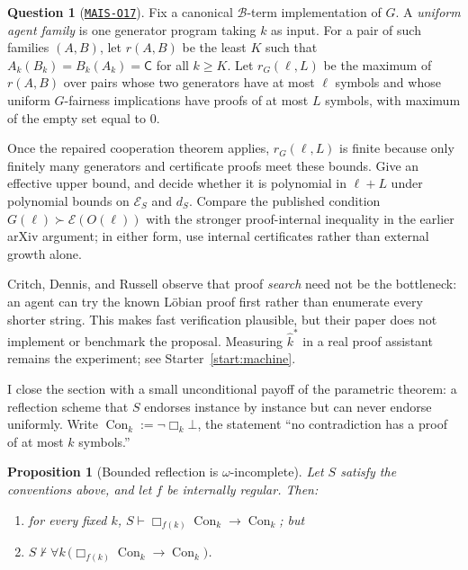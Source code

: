 \documentclass[11pt]{amsart}
\newcommand{\Oid}[1]{\href{https://github.com/lionellevine/MAIS/blob/main/open-problems/MAIS-O#1.md}{\texttt{MAIS-O#1}}}
\theoremstyle{plain}
\newtheorem{proposition}[theorem]{Proposition}
\theoremstyle{definition}
\newtheorem{question}[theorem]{Question}
\newcommand{\Con}{\operatorname{Con}}
\newcommand{\Bud}{\mathcal{B}}
\begin{document}
\begin{question}[\Oid{17}]
\label{q:polyfairbot}
Fix a canonical $\Bud$-term implementation of $G$. A \emph{uniform agent family} is one generator program taking $k$ as input. For a pair of such families $(A,B)$, let $r(A,B)$ be the least $K$ such that $A_k(B_k)=B_k(A_k)=\mathsf C$ for all $k\ge K$. Let $r_G(\ell,L)$ be the maximum of $r(A,B)$ over pairs whose two generators have at most $\ell$ symbols and whose uniform $G$-fairness implications have proofs of at most $L$ symbols, with maximum of the empty set equal to $0$.

Once the repaired cooperation theorem applies, $r_G(\ell,L)$ is finite because only finitely many generators and certificate proofs meet these bounds. Give an effective upper bound, and decide whether it is polynomial in $\ell+L$ under polynomial bounds on $\mathcal E_S$ and $d_S$. Compare the published condition $G(\ell)\succ\mathcal E(O(\ell))$ with the stronger proof-internal inequality in the earlier arXiv argument; in either form, use internal certificates rather than external growth alone.
\end{question}

Critch, Dennis, and Russell \cite{cdr2022} observe that proof \emph{search} need not be the bottleneck: an agent can try the known L\"obian proof first rather than enumerate every shorter string. This makes fast verification plausible, but their paper does not implement or benchmark the proposal. Measuring $\hat{k}^{*}$ in a real proof assistant remains the experiment; see Starter~\ref{start:machine}.

I close the section with a small unconditional payoff of the parametric theorem: a reflection scheme that $S$ endorses instance by instance but can never endorse uniformly. Write $\Con_k := \neg\Box_k \bot$, the statement ``no contradiction has a proof of at most $k$ symbols.''

\begin{proposition}[Bounded reflection is $\omega$-incomplete]
\label{prop:omega}
Let $S$ satisfy the conventions above, and let $f$ be internally regular. Then:
\begin{enumerate}
\item for every fixed $k$, \; $S \vdash \Box_{f(k)}\Con_k \to \Con_k$; \quad but
\item $S \nvdash \forall k\,\bigl(\Box_{f(k)}\Con_k \to \Con_k\bigr)$.
\end{enumerate}
\end{proposition}
\end{document}
